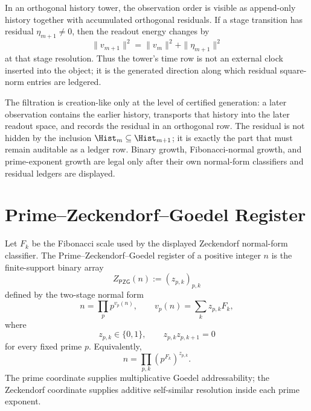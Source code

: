 \begin{principle}
\label{prin:rh-observation-time-residual-accumulation}
In an orthogonal history tower, the observation order is visible as
append-only history together with accumulated orthogonal residuals. If a
stage transition has residual $\eta_{m+1}\ne0$, then the readout energy
changes by
$$
\|v_{m+1}\|^2
=
\|v_m\|^2+\|\eta_{m+1}\|^2
$$
at that stage resolution. Thus the tower's time row is not an external
clock inserted into the object; it is the generated direction along
which residual square-norm entries are ledgered.
\end{principle}

\begin{principle}
\label{prin:rh-creation-like-growth-ledgered-residual-growth}
The filtration is creation-like only at the level of certified
generation: a later observation contains the earlier history, transports
that history into the later readout space, and records the residual in
an orthogonal row. The residual is not hidden by the inclusion
$\Hist_m\subseteq\Hist_{m+1}$; it is exactly the part that must remain
auditable as a ledger row. Binary growth, Fibonacci-normal growth, and
prime-exponent growth are legal only after their own normal-form
classifiers and residual ledgers are displayed.
\end{principle}

\section{Prime--Zeckendorf--Goedel Register}
\label{sec:rh-prime-zeckendorf-goedel-register}

\begin{definition}
\label{def:rh-prime-zeckendorf-goedel-register}
Let $F_k$ be the Fibonacci scale used by the displayed Zeckendorf
normal-form classifier. The Prime--Zeckendorf--Goedel register of a
positive integer $n$ is the finite-support binary array
$$
Z_{\mathsf{PZG}}(n):=(z_{p,k})_{p,k}
$$
defined by the two-stage normal form
$$
n=\prod_p p^{v_p(n)},
\qquad
v_p(n)=\sum_k z_{p,k}F_k,
$$
where
$$
z_{p,k}\in\{0,1\},
\qquad
z_{p,k}z_{p,k+1}=0
$$
for every fixed prime $p$. Equivalently,
$$
n
=
\prod_{p,k}\left(p^{F_k}\right)^{z_{p,k}}.
$$
The prime coordinate supplies multiplicative Goedel addressability; the
Zeckendorf coordinate supplies additive self-similar resolution inside
each prime exponent.
\end{definition}

